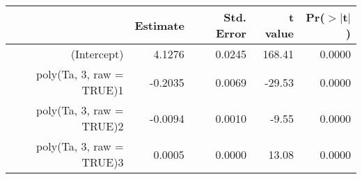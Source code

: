 \begin{tabular}{rrrrr}
  \hline
 & Estimate & Std. Error & t value & Pr($>$$|$t$|$) \\ 
  \hline
(Intercept) & 4.1276 & 0.0245 & 168.41 & 0.0000 \\ 
  poly(Ta, 3, raw = TRUE)1 & -0.2035 & 0.0069 & -29.53 & 0.0000 \\ 
  poly(Ta, 3, raw = TRUE)2 & -0.0094 & 0.0010 & -9.55 & 0.0000 \\ 
  poly(Ta, 3, raw = TRUE)3 & 0.0005 & 0.0000 & 13.08 & 0.0000 \\ 
   \hline
\end{tabular}
